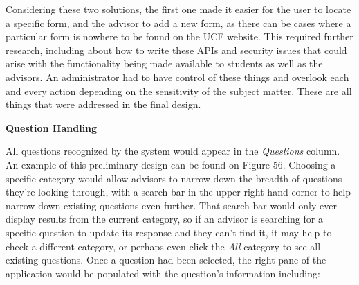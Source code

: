 \documentclass[titlepage, 12pt]{article}
\begin{document}
Considering these two solutions, the first one made it easier for the user to locate a specific form, and the advisor to add a new form, as there can be cases where a particular form is nowhere to be found on the UCF website. This required further research, including about how to write these APIs and security issues that could arise with the functionality being made available to students as well as the advisors. An administrator had to have control of these things and overlook each and every action depending on the sensitivity of the subject matter. These are all things that were addressed in the final design.

\textbf{Question Handling}

All questions recognized by the system would appear in the \emph{Questions} column. An example of this preliminary design can be found on Figure 56. Choosing a specific category would allow advisors to narrow down the breadth of questions they’re looking through, with a search bar in the upper right-hand corner to help narrow down existing questions even further. That search bar would only ever display results from the current category, so if an advisor is searching for a specific question to update its response and they can’t find it, it may help to check a different category, or perhaps even click the \emph{All} category to see all existing questions. Once a question had been selected, the right pane of the application would be populated with the question’s information including:
\end{document}
